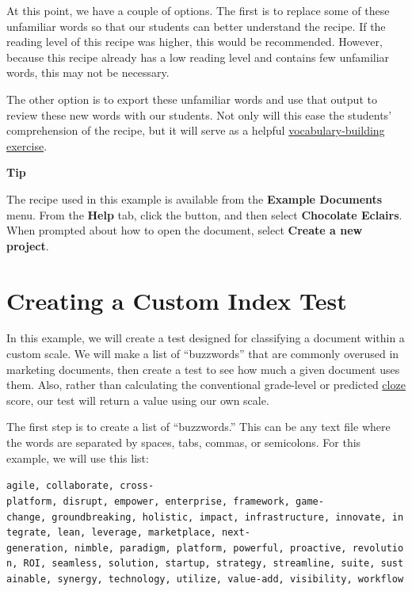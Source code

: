 \documentclass[
]{book}
\newenvironment{tipsection}
    {
    \begin{tcolorbox}[colframe=lightgray,colback=lightyellow,arc=3mm]
    \faLightbulb[regular] \textbf{Tip} \newline
    }
    {
    \end{tcolorbox}
    }
\theoremstyle{definition}
\theoremstyle{definition}
\theoremstyle{definition}
\theoremstyle{definition}
\theoremstyle{remark}
\begin{document}
At this point, we have a couple of options. The first is to replace some of these unfamiliar words so that our students can better understand the recipe. If the reading level of this recipe was higher, this would be recommended. However, because this recipe already has a low reading level and contains few unfamiliar words, this may not be necessary.

The other option is to export these unfamiliar words and use that output to review these new words with our students. Not only will this ease the students' comprehension of the recipe, but it will serve as a helpful \protect\hyperlink{vocab-builder-example}{vocabulary-building exercise}.

\begin{tipsection}
The recipe used in this example is available from the \textbf{Example Documents} menu. From the \textbf{Help} tab, click the  button, and then select \textbf{Chocolate Eclairs}. When prompted about how to open the document, select \textbf{Create a new project}.

\end{tipsection}


\hypertarget{creating-a-custom-index-test}{%
\section{Creating a Custom Index Test}\label{creating-a-custom-index-test}}

In this example, we will create a test designed for classifying a document within a custom scale. We will make a list of ``buzzwords'' that are commonly overused in marketing documents, then create a test to see how much a given document uses them. Also, rather than calculating the conventional grade-level or predicted \protect\hyperlink{cloze}{cloze} score, our test will return a value using our own scale.

The first step is to create a list of ``buzzwords.'' This can be any text file where the words are separated by spaces, tabs, commas, or semicolons. For this example, we will use this list:

\texttt{agile,\ collaborate,\ cross-platform,\ disrupt,\ empower,\ enterprise,\ framework,\ game-change,\ groundbreaking,\ holistic,\ impact,\ infrastructure,\ innovate,\ integrate,\ lean,\ leverage,\ marketplace,\ next-generation,\ nimble,\ paradigm,\ platform,\ powerful,\ proactive,\ revolution,\ ROI,\ seamless,\ solution,\ startup,\ strategy,\ streamline,\ suite,\ sustainable,\ synergy,\ technology,\ utilize,\ value-add,\ visibility,\ workflow}
\end{document}
